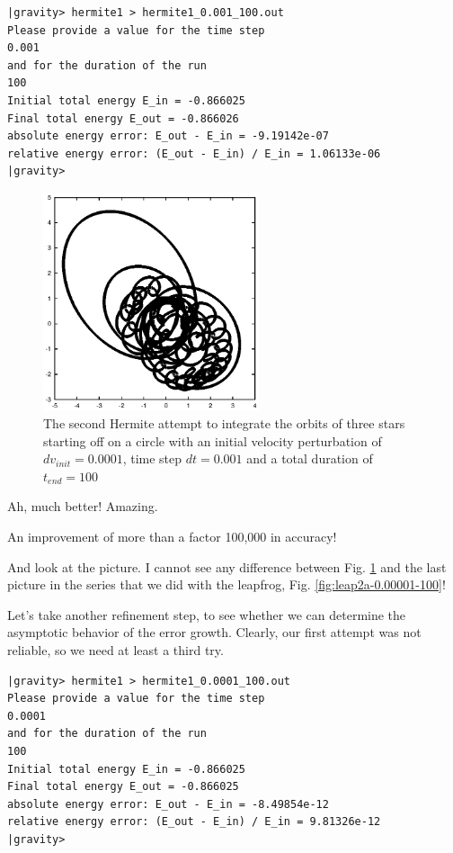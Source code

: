\begin{small}
\begin{verbatim}
|gravity> hermite1 > hermite1_0.001_100.out
Please provide a value for the time step
0.001
and for the duration of the run
100
Initial total energy E_in = -0.866025
Final total energy E_out = -0.866026
absolute energy error: E_out - E_in = -9.19142e-07
relative energy error: (E_out - E_in) / E_in = 1.06133e-06
|gravity>
\end{verbatim}
\end{small}

\begin{figure}[htb]
\centering
\includegraphics[width=2.5in]{chap6/hermite1_0.001_100.ps}
\caption[Three stars on a circle, Hermite, $dv_{init}=0.0001$, $dt = 0.001$,
$t_{end} = 100$]
{The second Hermite attempt to integrate the orbits of three stars
starting off on a circle with an initial velocity perturbation of 
$dv_{init}=0.0001$, time step $dt = 0.001$ and a total duration of
$t_{end} = 100$}
\label{fig:hermite1-0.001-100}
\end{figure}

\abc

\carol
Ah, much better!  Amazing.

\bob
An improvement of more than a factor 100,000 in accuracy!

\carol
And look at the picture.  I cannot see any difference between Fig. 
\ref{fig:hermite1-0.001-100} and the last picture in the series that
we did with the leapfrog, Fig. \ref{fig:leap2a-0.00001-100}!

\alice
Let's take another refinement step, to see whether we can determine
the asymptotic behavior of the error growth.  Clearly, our first
attempt was not reliable, so we need at least a third try.

\cba

\begin{small}
\begin{verbatim}
|gravity> hermite1 > hermite1_0.0001_100.out
Please provide a value for the time step
0.0001
and for the duration of the run
100
Initial total energy E_in = -0.866025
Final total energy E_out = -0.866025
absolute energy error: E_out - E_in = -8.49854e-12
relative energy error: (E_out - E_in) / E_in = 9.81326e-12
|gravity>
\end{verbatim}
\end{small}

